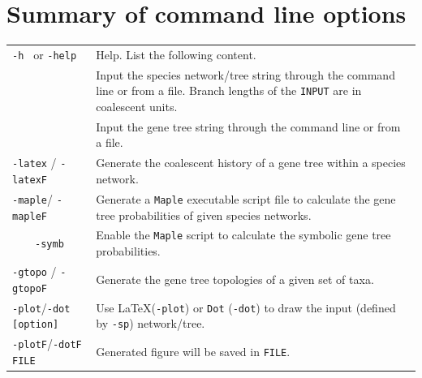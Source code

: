 \section{Summary of command line options}
\begin{longtable}{lp{9cm}}
{\tt -h } or {\tt -help } &  Help. List the following content.\\
{\verb -sp } {\tt INPUT} & Input the species network/tree string through the command line or from a file. Branch lengths of the {\tt INPUT} are in coalescent units.\\
{\verb -gt } {\tt INPUT} & Input the gene tree string through the command line or from a file. \\
{\tt -latex} / {\tt -latexF} & Generate the coalescent history of a gene tree within a species network.\\
{\tt -maple}/ {\tt -mapleF}& Generate a {\tt Maple} executable script file to calculate the gene tree probabilities of given species networks.\\
 $\qquad${\tt -symb}& Enable the {\tt Maple} script to calculate the symbolic gene tree probabilities.\\
{\tt -gtopo} / {\tt -gtopoF}& Generate the gene tree topologies of a given set of taxa.\\
{\tt -plot}/{\tt -dot} {\tt [option]} & Use \LaTeX ({\tt -plot}) or {\tt Dot} ({\tt -dot}) to draw the input (defined by {\tt -sp}) network/tree.\\
{\tt -plotF}/{\tt -dotF} {\tt FILE}& Generated figure will be saved in {\tt FILE}.\\
\end{longtable}




